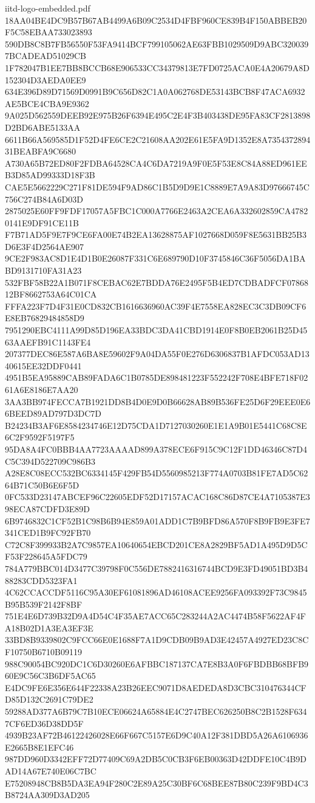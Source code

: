 \begin{filecontents*}[overwrite]{iitd-logo-embedded.pdf}
18AA04BE4DC9B57B67AB4499A6B09C2534D4FBF960CE839B4F150ABBEB20F5C58EBAA733023893
590DB8C8B7FB56550F53FA9414BCF799105062AE63FBB1029509D9ABC3200397BCADEAD51029CB
1F782047B1EE7BB8BCCB68E906533CC34379813E7FD0725ACA0E4A20679A8D152304D3AEDA0EE9
634E396D89D71569D0991B9C656D82C1A0A062768DE53143BCB8F47ACA6932AE5BCE4CBA9E9362
9A025D562559DEEB92E975B26F6394E495C2E4F3B403438DE95FA83CF2813898D2BD6ABE5133AA
6611B66A569585D1F52D4FE6CE2C21608AA202E61E5FA9D1352E8A735437289431BEABFA9C6680
A730A65B72ED80F2FDBA64528CA4C6DA7219A9F0E5F53E8C84A88ED961EEB3D85AD99333D18F3B
CAE5E5662229C271F81DE594F9AD86C1B5D9D9E1C8889E7A9A83D97666745C756C274B84A6D03D
2875025E60FF9FDF17057A5FBC1C000A7766E2463A2CEA6A332602859CA47820141E9DF91CE11B
F7B71AD5F9E7F9CE6FA00E74B2EA13628875AF1027668D059F8E5631BB25B3D6E3F4D2564AE907
9CE2F983AC8D1E4D1B0E26087F331C6E689790D10F3745846C36F5056DA1BABD9131710FA31A23
532FBF58B22A1B071F8CEBAC62E7BDDA76E2495F5B4ED7CDBADFCF0786812BF8662753A64C01CA
FFFA223F7D4F31E0CD832CB1616636960AC39F4E7558EA828EC3C3DB09CF6E8EB76829484858D9
7951290EBC4111A99D85D196EA33BDC3DA41CBD1914E0F8B0EB2061B25D4563AAEFB91C1143FE4
207377DEC86E587A6BA8E59602F9A04DA55F0E276D6306837B1AFDC053AD1340615EE32DDF0441
4951B5EA95889CAB89FADA6C1B0785DE898481223F552242F708E4BFE718F0261A6E8186E7AA20
3AA3BB974FECCA7B1921DD8B4D0E9D0B66628AB89B536FE25D6F29EEE0E66BEED89AD797D3DC7D
B24234B3AF6E8584234746E12D75CDA1D7127030260E1E1A9B01E5441C68C8E6C2F9592F5197F5
95DA8A4FC0BBB4AA7723AAAAD899A378ECE6F915C9C12F1DD46346C87D4C5C394D522709C986B3
A28E8C08ECC532BC6334145F429FB54D5560985213F774A0703B81FE7AD5C6264B71C50B6E6F5D
0FC533D23147ABCEF96C22605EDF52D17157ACAC168C86D87CE4A7105387E398ECA87CDFD3E89D
6B9746832C1CF52B1C98B6B94E859A01ADD1C7B9BFD86A570F8B9FB9E3FE7341CED1B9FC92FB70
C72C8F399933B2A7C9857EA10640654EBCD201CE8A2829BF5AD1A495D9D5CF53F228645A5FDC79
784A779BBC014D3477C39798F0C556DE7882416316744BCD9E3FD49051BD3B488283CDD5323FA1
4C62CCACCDF5116C95A30EF61081896AD46108ACEE9256FA093392F73C9845B95B539F2142F8BF
751E4E6D739B32D9A4D54C4F35AE7ACC65C283244A2AC4474B58F5622AF4FA18B02D1A3EA3EF3E
33BD8B9339802C9FCC66E0E1688F7A1D9CDB09B9AD3E42457A4927ED23C8CF10750B6710B09119
988C90054BC920DC1C6D30260E6AFBBC187137CA7E8B3A0F6FBDBB68BFB960E9C56C3B6DF5AC65
E4DC9FE6E356E644F22338A23B26EEC9071D8AEDEDA8D3CBC310476344CFD85D132C2691C79DE2
59288AD377A6B79C7B10ECE06624A65884E4C2747BEC626250B8C2B1528F6347CF6ED36D38DD5F
4939B23AF72B46122426028E66F667C5157E6D9C40A12F381DBD5A26A6106936E2665B8E1EFC46
987DD960D3342EFF72D77409C69A2DB5C0CB3F6EB00363D42DDFE10C4B9DAD14A67E740E06C7BC
E75208948CB8B5DA3EA94F280C2E89A25C30BF6C68BEE87B80C239F9BD4C3B8724AA309D3AD205

\end{filecontents*}
